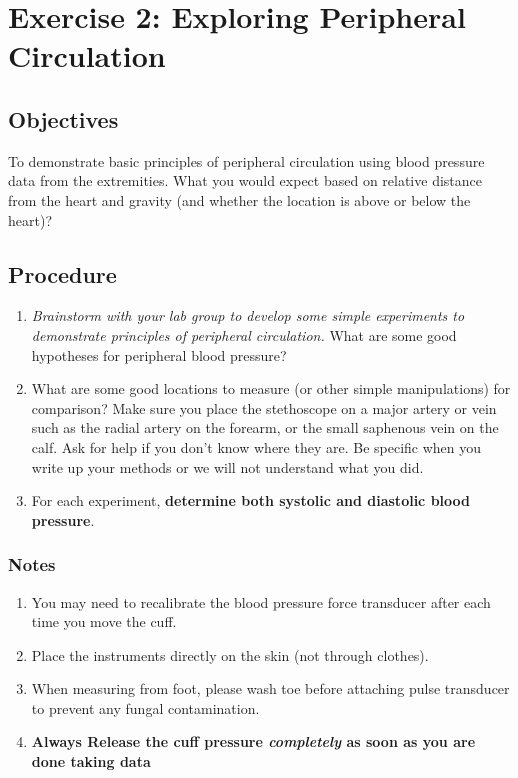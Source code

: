 \documentclass[
  letterpaper,
  DIV=11,
  numbers=noendperiod,
  oneside]{scrartcl}
\providecommand{\tightlist}{%
  \setlength{\itemsep}{0pt}\setlength{\parskip}{0pt}}\usepackage{longtable,booktabs,array}
\begin{document}
\hypertarget{exercise-2-exploring-peripheral-circulation}{%
\section{Exercise 2: Exploring Peripheral
Circulation}\label{exercise-2-exploring-peripheral-circulation}}

\hypertarget{objectives}{%
\subsection{Objectives}\label{objectives}}

To demonstrate basic principles of peripheral circulation using blood
pressure data from the extremities. What you would expect based on
relative distance from the heart and gravity (and whether the location
is above or below the heart)?

\hypertarget{procedure}{%
\subsection{Procedure}\label{procedure}}

\begin{enumerate}
\def\labelenumi{\arabic{enumi}.}
\tightlist
\item
  \emph{Brainstorm with your lab group to develop some simple
  experiments to demonstrate principles of peripheral circulation.} What
  are some good hypotheses for peripheral blood pressure?
\item
  What are some good locations to measure (or other simple
  manipulations) for comparison? Make sure you place the stethoscope on
  a major artery or vein such as the radial artery on the forearm, or
  the small saphenous vein on the calf. Ask for help if you don't know
  where they are. Be specific when you write up your methods or we will
  not understand what you did.
\item
  For each experiment, \textbf{determine both systolic and diastolic
  blood pressure}.
\end{enumerate}

\hypertarget{notes}{%
\subsubsection{Notes}\label{notes}}

\begin{enumerate}
\def\labelenumi{\arabic{enumi}.}
\tightlist
\item
  You may need to recalibrate the blood pressure force transducer after
  each time you move the cuff.
\item
  Place the instruments directly on the skin (not through clothes).\\
\item
  When measuring from foot, please wash toe before attaching pulse
  transducer to prevent any fungal contamination.
\item
  \textbf{Always Release the cuff pressure \emph{completely} as soon as
  you are done taking data}
\end{enumerate}
\end{document}
